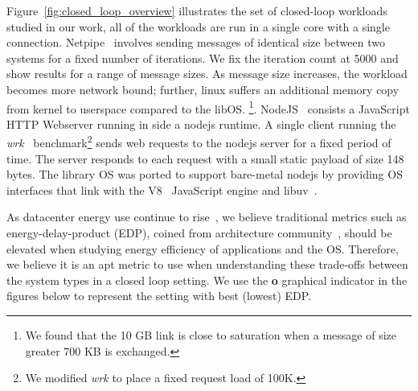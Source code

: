 Figure~\ref{fig:closed_loop_overview} illustrates the set of closed-loop workloads studied in our work, all of the workloads are run in a single core with a single connection. Netpipe~\cite{snell1996netpipe} involves sending messages of identical size between two systems for a fixed number of iterations. We fix the iteration count at 5000 and show results for a range of message sizes. As message size increases, the workload becomes more network bound; further, linux suffers an additional memory copy from kernel to userspace compared to the libOS. \footnote{We found that the 10 GB link is close to saturation when a message of size greater 700 KB is exchanged.}. NodeJS~\cite{nodejs} consists a JavaScript HTTP Webserver running in side a nodejs runtime. A single client running the \textit{wrk}~\cite{wrk} benchmark\footnote{We modified \textit{wrk} to place a fixed request load of 100K.} sends web requests to the nodejs server for a fixed period of time. The server responds to each request with a small static payload of size 148 bytes. The library OS was ported to support bare-metal nodejs by providing OS interfaces that link with the V8~\cite{v8} JavaScript engine and libuv~\cite{libuv}. 

As datacenter energy use continue to rise~\cite{gupta2020chasing, NLP-energy,warehouse-power}, we believe traditional metrics such as energy-delay-product (EDP), coined from architecture community~\cite{573184,10.1109/40.888701}, should be elevated when studying energy efficiency of applications and the OS. Therefore, we believe it is an apt metric to use when understanding these trade-offs between the system types in a closed loop setting. We use the {\larger[4]\textbf{o}} graphical indicator in the figures below to represent the setting with best (lowest) EDP.



